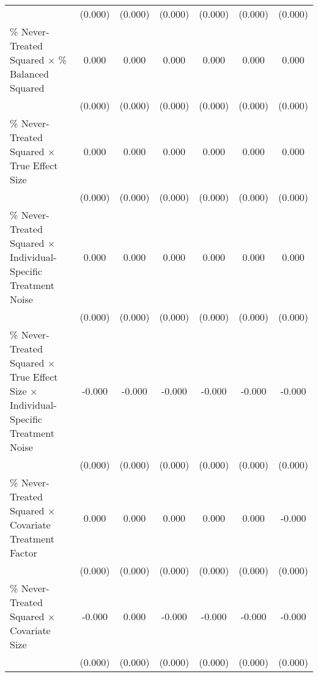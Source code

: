 \begin{table}[htbp]
{\begin{tabular}{p{4.5in}|*{6}{c}}
                    &     (0.000)         &     (0.000)         &     (0.000)         &     (0.000)         &     (0.000)         &     (0.000)         \\
\% Never-Treated Squared $\times$ \% Balanced Squared&       0.000\sym{***}&       0.000\sym{***}&       0.000\sym{***}&       0.000\sym{***}&       0.000\sym{***}&       0.000\sym{***}\\
                    &     (0.000)         &     (0.000)         &     (0.000)         &     (0.000)         &     (0.000)         &     (0.000)         \\
\% Never-Treated Squared $\times$ True Effect Size&       0.000         &       0.000         &       0.000         &       0.000\sym{*}  &       0.000         &       0.000\sym{*}  \\
                    &     (0.000)         &     (0.000)         &     (0.000)         &     (0.000)         &     (0.000)         &     (0.000)         \\
\% Never-Treated Squared $\times$ Individual-Specific Treatment Noise&       0.000\sym{**} &       0.000\sym{**} &       0.000\sym{**} &       0.000         &       0.000\sym{*}  &       0.000\sym{*}  \\
                    &     (0.000)         &     (0.000)         &     (0.000)         &     (0.000)         &     (0.000)         &     (0.000)         \\
\% Never-Treated Squared $\times$ True Effect Size $\times$ Individual-Specific Treatment Noise&      -0.000\sym{*}  &      -0.000\sym{**} &      -0.000         &      -0.000         &      -0.000         &      -0.000         \\
                    &     (0.000)         &     (0.000)         &     (0.000)         &     (0.000)         &     (0.000)         &     (0.000)         \\
\% Never-Treated Squared $\times$ Covariate Treatment Factor&       0.000\sym{***}&       0.000         &       0.000         &       0.000         &       0.000\sym{***}&      -0.000         \\
                    &     (0.000)         &     (0.000)         &     (0.000)         &     (0.000)         &     (0.000)         &     (0.000)         \\
\% Never-Treated Squared $\times$ Covariate Size&      -0.000         &       0.000         &      -0.000         &      -0.000\sym{*}  &      -0.000         &      -0.000\sym{*}  \\
                    &     (0.000)         &     (0.000)         &     (0.000)         &     (0.000)         &     (0.000)         &     (0.000)         \\

\end{tabular}}
\end{table}
